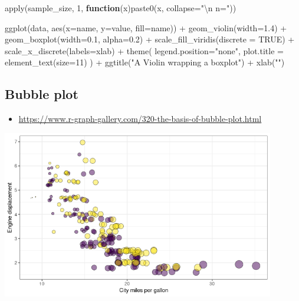 \documentclass[
]{book}
\newenvironment{Shaded}{\begin{snugshade}}{\end{snugshade}}
\newcommand{\AttributeTok}[1]{\textcolor[rgb]{0.77,0.63,0.00}{#1}}
\newcommand{\ConstantTok}[1]{\textcolor[rgb]{0.00,0.00,0.00}{#1}}
\newcommand{\ControlFlowTok}[1]{\textcolor[rgb]{0.13,0.29,0.53}{\textbf{#1}}}
\newcommand{\DecValTok}[1]{\textcolor[rgb]{0.00,0.00,0.81}{#1}}
\newcommand{\FloatTok}[1]{\textcolor[rgb]{0.00,0.00,0.81}{#1}}
\newcommand{\FunctionTok}[1]{\textcolor[rgb]{0.00,0.00,0.00}{#1}}
\newcommand{\NormalTok}[1]{#1}
\newcommand{\SpecialCharTok}[1]{\textcolor[rgb]{0.00,0.00,0.00}{#1}}
\newcommand{\StringTok}[1]{\textcolor[rgb]{0.31,0.60,0.02}{#1}}
\providecommand{\tightlist}{%
  \setlength{\itemsep}{0pt}\setlength{\parskip}{0pt}}
\begin{document}
\begin{Shaded}
\begin{Highlighting}[]
\FunctionTok{apply}\NormalTok{(sample\_size, }\DecValTok{1}\NormalTok{, }\ControlFlowTok{function}\NormalTok{(x)}\FunctionTok{paste0}\NormalTok{(x, }\AttributeTok{collapse=}\StringTok{"}\SpecialCharTok{\textbackslash{}n}\StringTok{ n="}\NormalTok{))}

\FunctionTok{ggplot}\NormalTok{(data, }\FunctionTok{aes}\NormalTok{(}\AttributeTok{x=}\NormalTok{name, }\AttributeTok{y=}\NormalTok{value, }\AttributeTok{fill=}\NormalTok{name)) }\SpecialCharTok{+}
    \FunctionTok{geom\_violin}\NormalTok{(}\AttributeTok{width=}\FloatTok{1.4}\NormalTok{) }\SpecialCharTok{+}
    \FunctionTok{geom\_boxplot}\NormalTok{(}\AttributeTok{width=}\FloatTok{0.1}\NormalTok{, }\AttributeTok{alpha=}\FloatTok{0.2}\NormalTok{) }\SpecialCharTok{+}
    \FunctionTok{scale\_fill\_viridis}\NormalTok{(}\AttributeTok{discrete =} \ConstantTok{TRUE}\NormalTok{) }\SpecialCharTok{+}
    \FunctionTok{scale\_x\_discrete}\NormalTok{(}\AttributeTok{labels=}\NormalTok{xlab) }\SpecialCharTok{+}
    \FunctionTok{theme}\NormalTok{(}
      \AttributeTok{legend.position=}\StringTok{"none"}\NormalTok{,}
      \AttributeTok{plot.title =} \FunctionTok{element\_text}\NormalTok{(}\AttributeTok{size=}\DecValTok{11}\NormalTok{)}
\NormalTok{    ) }\SpecialCharTok{+}
    \FunctionTok{ggtitle}\NormalTok{(}\StringTok{"A Violin wrapping a boxplot"}\NormalTok{) }\SpecialCharTok{+}
    \FunctionTok{xlab}\NormalTok{(}\StringTok{""}\NormalTok{)}
\end{Highlighting}
\end{Shaded}

\hypertarget{bubble-plot}{%
\subsection{Bubble plot}\label{bubble-plot}}

\begin{itemize}
\tightlist
\item
  \url{https://www.r-graph-gallery.com/320-the-basis-of-bubble-plot.html}
\end{itemize}

\includegraphics[width=4.6875in,height=\textheight]{images/10/000049.png}
\end{document}
